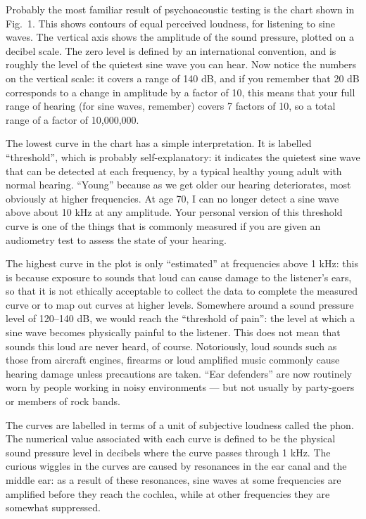 

  Probably the most familiar result of psychoacoustic testing is the chart 
  shown in Fig.\ 1. This shows contours of equal perceived loudness, for 
  listening to sine waves. The vertical axis shows the amplitude of the sound 
  pressure, plotted on a decibel scale. The zero level is defined by an 
  international convention, and is roughly the level of the quietest sine wave 
  you can hear. Now notice the numbers on the vertical scale: it covers a range 
  of 140 dB, and if you remember that 20 dB corresponds to a change in 
  amplitude by a factor of 10, this means that your full range of hearing (for 
  sine waves, remember) covers 7 factors of 10, so a total range of a factor of 
  10,000,000. 


  The lowest curve in the chart has a simple interpretation. It is labelled 
  ``threshold'', which is probably self-explanatory: it indicates the quietest 
  sine wave that can be detected at each frequency, by a typical healthy young 
  adult with normal hearing. ``Young'' because as we get older our hearing 
  deteriorates, most obviously at higher frequencies. At age 70, I can no 
  longer detect a sine wave above about 10 kHz at any amplitude. Your personal 
  version of this threshold curve is one of the things that is commonly 
  measured if you are given an audiometry test to assess the state of your 
  hearing. 

  The highest curve in the plot is only ``estimated'' at frequencies above 1 
  kHz: this is because exposure to sounds that loud can cause damage to the 
  listener's ears, so that it is not ethically acceptable to collect the data 
  to complete the measured curve or to map out curves at higher levels. 
  Somewhere around a sound pressure level of 120--140 dB, we would reach the 
  ``threshold of pain'': the level at which a sine wave becomes physically 
  painful to the listener. This does not mean that sounds this loud are never 
  heard, of course. Notoriously, loud sounds such as those from aircraft 
  engines, firearms or loud amplified music commonly cause hearing damage 
  unless precautions are taken. ``Ear defenders'' are now routinely worn by 
  people working in noisy environments --- but not usually by party-goers or 
  members of rock bands. 

  The curves are labelled in terms of a unit of subjective loudness called the 
  phon. The numerical value associated with each curve is defined to be the 
  physical sound pressure level in decibels where the curve passes through 1 
  kHz. The curious wiggles in the curves are caused by resonances in the ear 
  canal and the middle ear: as a result of these resonances, sine waves at some 
  frequencies are amplified before they reach the cochlea, while at other 
  frequencies they are somewhat suppressed. 


